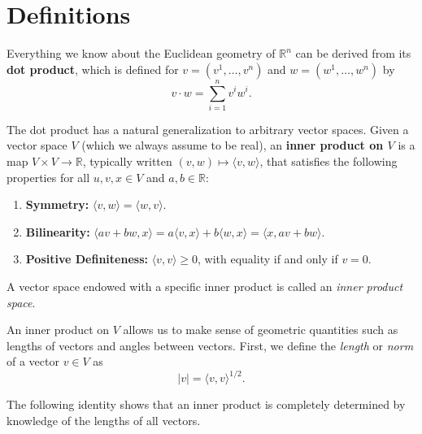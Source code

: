 
\section{Definitions}

Everything we know about the Euclidean geometry of $\mathbb{R}^n$ can be derived from its \textbf{dot product}, which is defined for $v = (v^1, \ldots, v^n)$ and $w = (w^1, \ldots, w^n)$ by
\[
v \cdot w = \sum_{i=1}^{n} v^i w^i.
\]

The dot product has a natural generalization to arbitrary vector spaces. Given a vector space $V$ (which we always assume to be real), an \textbf{inner product on $V$} is a map $V \times V \to \mathbb{R}$, typically written $(v, w) \mapsto \langle v, w \rangle$, that satisfies the following properties for all $u, v, x \in V$ and $a, b \in \mathbb{R}$:

\begin{enumerate}
\item[\textmd{(i)}] \textbf{Symmetry:} $\langle v, w \rangle = \langle w, v \rangle$.
\item[\textmd{(ii)}] \textbf{Bilinearity:} $\langle av + bw, x \rangle = a\langle v, x \rangle + b\langle w, x \rangle = \langle x, av + bw \rangle$.
\item[\textmd{(iii)}] \textbf{Positive Definiteness:} $\langle v,v \rangle \geq 0$, with equality if and only if $v = 0$.
\end{enumerate}

A vector space endowed with a specific inner product is called an \textit{inner product space}.

An inner product on $V$ allows us to make sense of geometric quantities such as lengths of vectors and angles between vectors. First, we define the \textit{length} or \textit{norm} of a vector $v \in V$ as
$$|v| = \langle v,v \rangle^{1/2}.$$

The following identity shows that an inner product is completely determined by knowledge of the lengths of all vectors.

